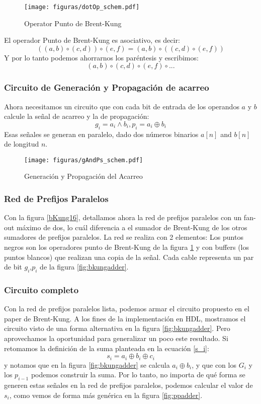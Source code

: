 \begin{figure}[h!]
  \centering
\texttt{[image: figuras/dotOp\_schem.pdf]}
  \caption{Operator Punto de Brent-Kung}
  \label{dotOp}
\end{figure}
El operador Punto de Brent-Kung es asociativo, es decir:
$$((a,b) \circ( c,d))\circ (e,f)  = (a,b)\circ((c,d)\circ(e,f))$$
Y por lo tanto podemos ahorrarnos los paréntesis y escribimos:
$$(a,b)\circ(c,d)\circ(e,f)\circ...$$

\subsubsection {Circuito de Generación y Propagación de acarreo}
Ahora necesitamos un circuito que con cada bit de entrada de los operandos \(a\) y \(b\) calcule la señal de acarreo y la de propagación:
$$g_i=a_i \wedge b_i, p_i=a_i\oplus b_i$$
Esas señales se generan en paralelo, dado dos números binarios \(a[n]\) and \(b[n]\) de longitud \(n\).


\begin{figure}[h!]
  \centering
\texttt{[image: figuras/gAndPs\_schem.pdf]}
  \caption{Generación y Propagación del Acarreo}
  \label{gAndPs}
\end{figure}

\subsubsection {Red de Prefijos Paralelos}
\noindent Con la figura \ref{bKung16}, detallamos ahora la red de prefijos paralelos con un fan-out máximo de dos, lo cuál diferencia a el sumador de Brent-Kung de los otros sumadores de prefijos paralelos. La red se realiza con 2 elementos: Los puntos negros son los operadores punto de Brent-Kung de la figura \ref{dotOp} y con buffers (los puntos blancos) que realizan una copia de la señal. Cada cable representa un par de bit \(g_i\),\(p_i\) de la figura \ref{fig:bkungadder}.

\subsubsection {Circuito completo}
Con la red de prefijos paralelos lista, podemos armar el circuito propuesto en el paper de Brent-Kung\cite{brent-kung}. A los fines de la implementación en HDL, mostramos el circuito visto de una forma alternativa en la figura \ref{fig:bkungadder}. Pero aprovechamos la oportunidad para generalizar un poco este resultado. Si retomamos la definición de la suma planteada en la ecuación \ref{s_i}:
$$
s_i = a_i \oplus b_i\oplus c_i
$$
y notamos que en la figura \ref{fig:bkungadder} se calcula $a_i \oplus b_i$, y que con los $G_i$ y los $p_{i-1}$ podemos construir la suma. Por lo tanto, no importa de qué forma se generen estas señales en la red de prefijos paralelos, podemos calcular el valor de $s_i$, como vemos de forma más genérica en la figura \ref{fig:ppadder}.

